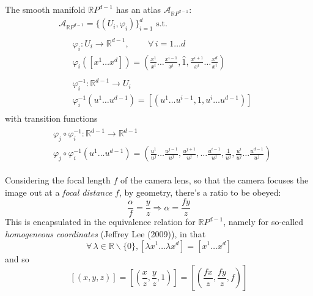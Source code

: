 \documentclass[10pt]{amsart}
\begin{document}
\begin{multicols*}{2}
The smooth manifold $\mathbb{R}P^{d-1}$ has an atlas $\mathcal{A}_{\mathbb{R}P^{d-1}}$: 
\begin{equation}
\begin{gathered}
	\mathcal{A}_{\mathbb{R}P^{d-1} } = \lbrace ( U_i , \varphi_i) \rbrace_{i=1}^d \text{ s.t. } \\ 
\begin{gathered}
\begin{aligned}
	& \varphi_i: U_i \to \mathbb{R}^{d-1} , \qquad \, \forall \, i =1 \dots d \\
	& \varphi_i([x^1 \dots x^d]) = \left( \frac{x^1}{x^i} \dots \frac{x^{i-1}}{x^i} , \widehat{1}, \frac{x^{i+1}}{x^i} \dots \frac{x^d}{x^i} \right) 
\end{aligned} \\
\begin{aligned}
	& \varphi_i^{-1} : \mathbb{R}^{d-1} \to U_i \\ 
	& \varphi_i^{-1} (u^1\dots u^{d-1}) = [ (u^1 \dots u^{i-1}, 1, u^i \dots u^{d-1} )]  
\end{aligned}
\end{gathered}
\end{gathered}
\end{equation}
with transition functions
\[
\begin{gathered}
	\begin{aligned}
	& \varphi_j \circ \varphi_i^{-1} : \mathbb{R}^{d-1} \to \mathbb{R}^{d-1} \\ 
	& \varphi_j \circ \varphi_i^{-1} (u^1 \dots u^{d-1}) = \left( \frac{u^1}{u^j} \dots \frac{u^{j-1}}{u^j}  , \frac{u^{j+1}}{u^j}  , \dots \frac{u^{i-1}}{u^j} , \frac{1}{u^j} , \frac{u^i}{u^j}   \dots \frac{u^{d-1}}{u^j}  \right)
\end{aligned}
\end{gathered}
\]

Considering the focal length $f$ of the camera lens, so that the camera focuses the image out at a \emph{focal distance} $f$, by geometry, there's a ratio to be obeyed:
\[
\frac{\alpha}{f} = \frac{y}{z} \Longrightarrow \alpha = \frac{fy}{z}
\]
This is encapsulated in the equivalence relation for $\mathbb{R}P^{d-1}$, namely for so-called \emph{homogeneous coordinates} (Jeffrey Lee (2009)), in that 
\[
\forall \, \lambda \in \mathbb{R} \backslash \lbrace 0 \rbrace , [\lambda x^1 \dots \lambda x^d] = [x^1 \dots x^d] 
\]
and so 
\[
[(x,y,z) ] = [ \left( \frac{x}{z} , \frac{y}{z} , 1 \right) ] = \left[ \left( \frac{fx}{z}, \frac{fy}{z} , f \right) \right]
\]


\end{multicols*}
\end{document}
